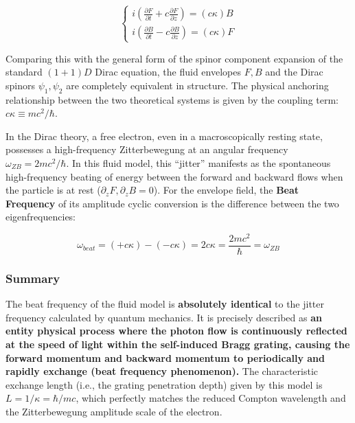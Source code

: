\documentclass[12pt, a4paper]{article}
\begin{document}
\begin{equation}
\begin{cases}
i \left( \frac{\partial F}{\partial t} + c \frac{\partial F}{\partial z} \right) = (c\kappa) B \\
i \left( \frac{\partial B}{\partial t} - c \frac{\partial B}{\partial z} \right) = (c\kappa) F
\end{cases}
\end{equation}

Comparing this with the general form of the spinor component expansion of the standard $(1+1)D$ Dirac equation, the fluid envelopes $F, B$ and the Dirac spinors $\psi_1, \psi_2$ are completely equivalent in structure. The physical anchoring relationship between the two theoretical systems is given by the coupling term: \textbf{$c\kappa \equiv mc^2/\hbar$}.

In the Dirac theory, a free electron, even in a macroscopically resting state, possesses a high-frequency Zitterbewegung at an angular frequency $\omega_{ZB} = 2mc^2/\hbar$. In this fluid model, this ``jitter'' manifests as the spontaneous high-frequency beating of energy between the forward and backward flows when the particle is at rest ($\partial_z F, \partial_z B = 0$). For the envelope field, the \textbf{Beat Frequency} of its amplitude cyclic conversion is the difference between the two eigenfrequencies:

\begin{equation}
\omega_{beat} = (+c\kappa) - (-c\kappa) = 2c\kappa = \frac{2mc^2}{\hbar} = \omega_{ZB}
\end{equation}

\subsubsection{Summary}

The beat frequency of the fluid model is \textbf{absolutely identical} to the jitter frequency calculated by quantum mechanics. It is precisely described as \textbf{an entity physical process where the photon flow is continuously reflected at the speed of light within the self-induced Bragg grating, causing the forward momentum and backward momentum to periodically and rapidly exchange (beat frequency phenomenon).} The characteristic exchange length (i.e., the grating penetration depth) given by this model is $L = 1/\kappa = \hbar/mc$, which perfectly matches the reduced Compton wavelength and the Zitterbewegung amplitude scale of the electron.
\end{document}
